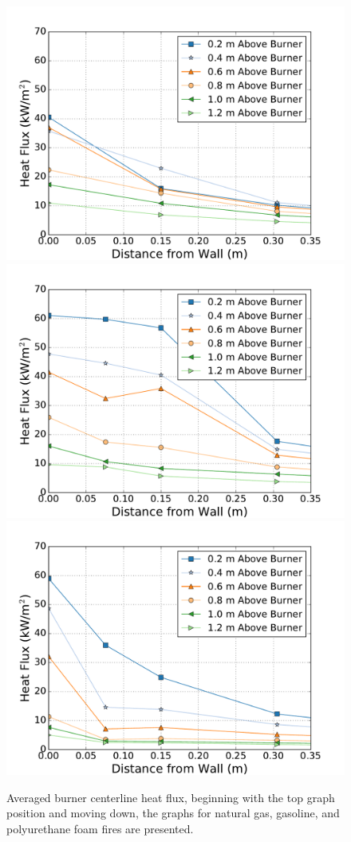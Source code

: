 \documentclass[twoside]{uocthesis}
\begin{document}
\begin{figure}[p]
	\centering
	\includegraphics[width=.625\columnwidth]{../Figures/IWGB_NG_HF_Center_Avg}\\
	\includegraphics[width=.625\columnwidth]{../Figures/IWGB_GAS_HF_Center_Avg}\\
	\includegraphics[width=.625\columnwidth]{../Figures/IWGB_PUF_HF_Center_Avg}\\
	\caption[Averaged burner centerline heat flux for the natural gas, gasoline, and foam fires]{Averaged burner centerline heat flux, beginning with the top graph position and moving down, the graphs for natural gas, gasoline, and polyurethane foam fires are presented.}
	\label{IWGB_HF_Comp_Center}
\end{figure}
\end{document}
